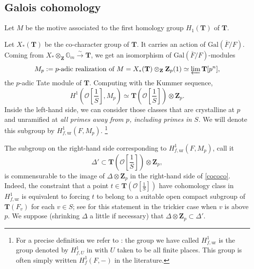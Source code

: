 \documentclass[10pt]{amsart}
\newcommand{\changecolor}{black}
\newcommand{\Z}{\mathbf{Z}}
\newcommand{\Gal}{\mathrm{Gal}}
\newcommand{\ramprimes}{S}
\theoremstyle{remark}
\begin{document}
\subsection{Galois cohomology}

Let $M$ be the motive associated to the first homology group $H_1(\mathbf{T})$ of $\mathbf{T}$. 

Let $X_*(\mathbf{T})$ be the co-character group of $\mathbf{T}$. It carries an action of $\Gal(\overline{F}/F)$. 
Coming from $X_* \otimes_{\Z} \mathbb{G}_m \stackrel{\sim}{\rightarrow} \mathbf{T}$, we get  an isomorphism of $\Gal(\overline{F}/F)$-modules 
$$M_p := \mbox{$p$-adic realization of $M$} = X_*(\mathbf{T}) \otimes_{\Z} \Z_{p}(1) \simeq \varprojlim \mathbf{T}[p^n],$$
the $p$-adic Tate module of $\mathbf{T}$. 
Computing with the Kummer sequence,
\begin{equation} \label{cococo} H^1(\mathcal{O}[\frac{1}{\ramprimes}] ,  M_p) \simeq \mathbf{T}(\mathcal{O}[\frac{1}{\ramprimes}]) \otimes \Z_p.  \end{equation}
Inside the left-hand side, we can consider those classes  that are crystalline at $p$ and 
 unramified at {\em all primes away from $p$, including primes in $S$.} We will denote this subgroup by $H^1_{f, \mathrm{ur}}(F, M_p)$. \footnote{For a precise
 definition we refer to \cite{BK}: the group we have called $H^1_{f, \mathrm{ur}}$  is the group denoted by $H^1_{f, U}$ in \cite[Definition 5.1]{BK} with $U$ taken to be all finite places. This group is often 
simply written $H^1_f(F, -)$ in the literature.}

 The subgroup on the right-hand side corresponding to $H^1_{f, \mathrm{ur}}(F, M_p)$, call it
$$ \Delta' \subset  \mathbf{T}(\mathcal{O}[\frac{1}{\ramprimes}]) \otimes \Z_p,$$ 
 is  commensurable to the image of  $\Delta \otimes \Z_p$ in the right-hand side of \eqref{cococo}.
{\color{\changecolor} Indeed, the constraint that a point $t \in  \mathbf{T}(\mathcal{O}[\frac{1}{\ramprimes}])$
have cohomology class in $H^1_{f, \mathrm{ur}}$ is equivalent
to forcing $t$ to belong to a suitable open compact subgroup of $\mathbf{T}(F_v)$
for each $v \in S$; see   \cite[Theorem 2.3.1]{HK} for this statement in the trickier case when $v$ is above $p$.} 
We suppose (shrinking $\Delta$ a little if necessary) that $\Delta \otimes \Z_p \subset \Delta'$.
  
\end{document}
